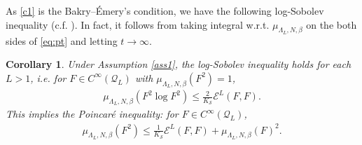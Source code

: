 \documentclass[11pt,UTF-8,reqno]{amsart}
\numberwithin{equation}{section}
\newtheorem{remark}[theorem]{Remark}
\newtheorem{corollary}[theorem]{Corollary}
\def\Ric{{\rm Ricci}}
\def\Hess{{\mathord{{\rm Hess}}}}
\def\cE{{\mathcal E}}
\def\cQ{{\mathcal Q}}
\def\cS{{\mathcal S}}
\def\mZ{{\mathbb Z}}
\def\leq{\leqslant}
\def\q{\mathfrak{q}}
\def\Ric{{\rm Ric}}
\def\Hess{{\mathord{{\rm Hess}}}}
\def\br{\begin{remark}}
\def\er{\end{remark}}
\def\bc{\begin{corollary}}
\def\ec{\end{corollary}}
\def\leq{\leqslant}
\begin{document}




As \eqref{c1} is the Bakry--\'Emery's condition, we have the following log-Sobolev inequality (c.f. \cite[Theorem 5.6.2]{Wang}). In fact, it follows from taking integral w.r.t. $\mu_{\Lambda_L,N,\beta}$ on the both sides of \eqref{eq:pt} and letting $t\to\infty$.

\bc Under Assumption \ref{ass1}, the log-Sobolev inequality holds for each $L>1$, i.e.
for $F\in C^\infty(\cQ_L)$ with $ \mu_{\Lambda_L,N,\beta}(F^2)=1$,
\begin{align*}
	\mu_{\Lambda_L,N,\beta}(F^2\log F^2)\leq \frac2{K_\cS }\cE^L(F,F).
\end{align*}
This implies the Poincar\'e inequality: for $F\in C^\infty(\cQ_L)$,
\begin{align}\label{eq:p1}
	\mu_{\Lambda_L,N,\beta}(F^2)\leq \frac1{K_\cS }\cE^L(F,F)+\mu_{\Lambda_L,N,\beta}(F)^2.
\end{align}
\ec
\end{document}
